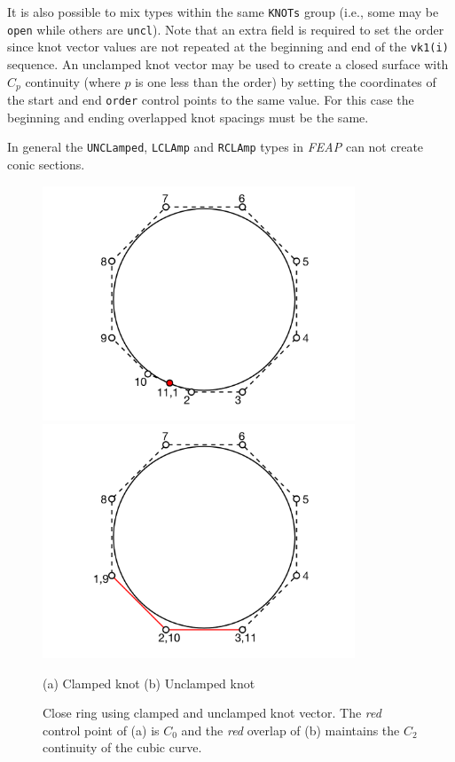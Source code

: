 It is also possible to mix types within the same \texttt{KNOTs} group
(i.e., some may be \texttt{open} while others are \texttt{uncl}).
Note that an extra field is required to set the order since knot vector
values are not repeated at the beginning and end of the \texttt{vk1(i)}
sequence.  An unclamped knot vector may be used to create a closed
surface with $C_p$ continuity (where $p$ is one less than the order)
by setting the coordinates of the start and end \texttt{order} control points
to the same value. For this case the beginning and ending overlapped knot
spacings must be the same.

In general the \texttt{UNCLamped}, \texttt{LCLAmp} and \texttt{RCLAmp} types
in \textsl{FEAP} can not create conic sections.  

\begin{figure}[!b]
\begin{center}

\centerline{
\includegraphics[height=2.75in]{figs/close_cl_8}
\hspace{0.4in}
\includegraphics[height=2.75in]{figs/close_un_8}
}

\centerline{(a) Clamped knot \hspace{2in} (b) Unclamped knot}

\caption{Close ring using clamped and unclamped knot vector.  
The \textit{red} control point of (a) is $C_0$ and the \textit{red} overlap
of (b) maintains the $C_2$ continuity of the cubic curve. \label{fig2cl} }
\end{center}
\end{figure}

